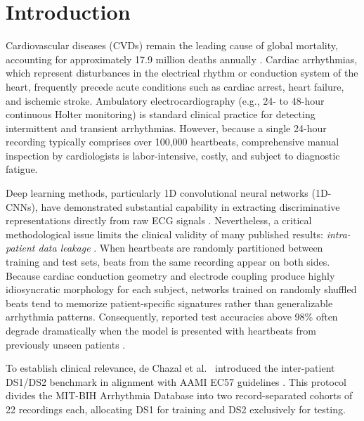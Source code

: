 \documentclass[conference]{IEEEtran}
\begin{document}
\section{Introduction}

Cardiovascular diseases (CVDs) remain the leading cause of global mortality, accounting for approximately 17.9 million deaths annually \cite{b1}. Cardiac arrhythmias, which represent disturbances in the electrical rhythm or conduction system of the heart, frequently precede acute conditions such as cardiac arrest, heart failure, and ischemic stroke. Ambulatory electrocardiography (e.g., 24- to 48-hour continuous Holter monitoring) is standard clinical practice for detecting intermittent and transient arrhythmias. However, because a single 24-hour recording typically comprises over 100,000 heartbeats, comprehensive manual inspection by cardiologists is labor-intensive, costly, and subject to diagnostic fatigue.

Deep learning methods, particularly 1D convolutional neural networks (1D-CNNs), have demonstrated substantial capability in extracting discriminative representations directly from raw ECG signals \cite{b4,b5}. Nevertheless, a critical methodological issue limits the clinical validity of many published results: \emph{intra-patient data leakage} \cite{b3,b12,b13}. When heartbeats are randomly partitioned between training and test sets, beats from the same recording appear on both sides. Because cardiac conduction geometry and electrode coupling produce highly idiosyncratic morphology for each subject, networks trained on randomly shuffled beats tend to memorize patient-specific signatures rather than generalizable arrhythmia patterns. Consequently, reported test accuracies above 98\% often degrade dramatically when the model is presented with heartbeats from previously unseen patients \cite{b12,b19}.

To establish clinical relevance, de Chazal et al.\ \cite{b3} introduced the inter-patient DS1/DS2 benchmark in alignment with AAMI EC57 guidelines \cite{b6}. This protocol divides the MIT-BIH Arrhythmia Database into two record-separated cohorts of 22 recordings each, allocating DS1 for training and DS2 exclusively for testing.
\end{document}
